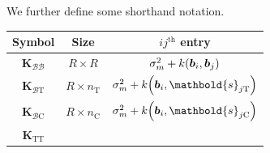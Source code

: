 \documentclass[letter]{article}
\DeclarePairedDelimiter{\parenthesis}{\lparen}{\rparen}
\newcommand{\del}[1]{\parenthesis*{#1}}
\newcommand{\treat}{\mathrm{T}}
\newcommand{\ctrol}{\mathrm{C}}
\newcommand{\svec}{\mathbold{s}}
\newcommand{\border}{\mathcal{B}}
\newcommand{\sentinel}{\bm{b}}
\newcommand{\numsent}{R}
\newcommand{\Kmat}{\mathbold{K}}
\newcommand{\KBB}{\Kmat_{\border \border}}
\newcommand{\KBT}{\Kmat_{\border \treat}}
\newcommand{\KBC}{\Kmat_{\border \ctrol}}
\newcommand{\KTT}{\Kmat_{\treat \treat}}
\begin{document}
    	We further define some shorthand notation.

\begin{longtable}[]{@{}ccc@{}}
\toprule
\begin{minipage}[b]{0.25\columnwidth}\centering\strut
Symbol\strut
\end{minipage} & \begin{minipage}[b]{0.30\columnwidth}\centering\strut
Size\strut
\end{minipage} & \begin{minipage}[b]{0.37\columnwidth}\centering\strut
\(ij^{\mathrm{th}}\) entry\strut
\end{minipage}\tabularnewline
\midrule
\endhead
\begin{minipage}[t]{0.25\columnwidth}\centering\strut
\(\KBB\)\strut
\end{minipage} & \begin{minipage}[t]{0.30\columnwidth}\centering\strut
\(\numsent \times \numsent\)\strut
\end{minipage} & \begin{minipage}[t]{0.37\columnwidth}\centering\strut
\(\sigma_m^2 + k\del{\sentinel_i,\sentinel_j}\)\strut
\end{minipage}\tabularnewline
\begin{minipage}[t]{0.25\columnwidth}\centering\strut
\(\KBT\)\strut
\end{minipage} & \begin{minipage}[t]{0.30\columnwidth}\centering\strut
\(\numsent \times n_\treat\)\strut
\end{minipage} & \begin{minipage}[t]{0.37\columnwidth}\centering\strut
\(\sigma_m^2 + k\del{\sentinel_i,\svec_{j\treat}}\)\strut
\end{minipage}\tabularnewline
\begin{minipage}[t]{0.25\columnwidth}\centering\strut
\(\KBC\)\strut
\end{minipage} & \begin{minipage}[t]{0.30\columnwidth}\centering\strut
\(\numsent \times n_\ctrol\)\strut
\end{minipage} & \begin{minipage}[t]{0.37\columnwidth}\centering\strut
\(\sigma_m^2 + k\del{\sentinel_i,\svec_{j\ctrol}}\)\strut
\end{minipage}\tabularnewline
\begin{minipage}[t]{0.25\columnwidth}\centering\strut
\(\KTT\)\strut
\end{minipage} & \begin{minipage}[t]{0.30\columnwidth}\centering\strut

\end{minipage}
\end{longtable}
\end{document}
